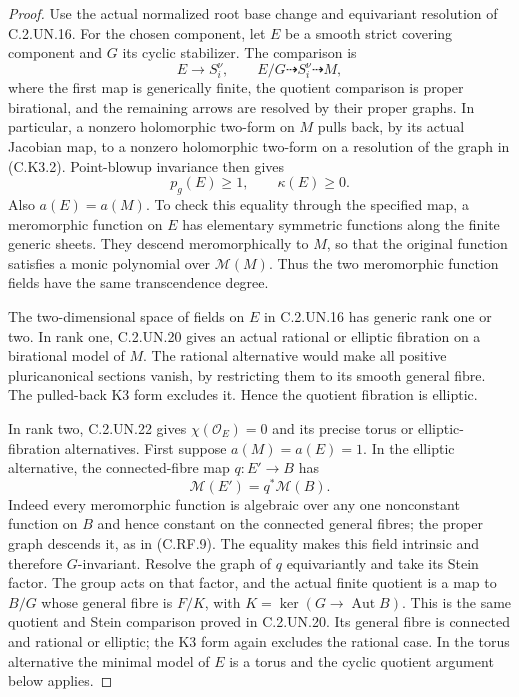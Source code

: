 \begin{proof}
Use the actual normalized root base change and equivariant
resolution of C.2.UN.16. For the chosen component, let $E$
be a smooth strict covering component and $G$ its cyclic
stabilizer. The comparison is
\[
 E\longrightarrow S_i^\nu,
 \qquad E/G\dashrightarrow S_i^\nu\dashrightarrow M,
                                                               \tag{C.K3.2}
\]
where the first map is generically finite, the quotient
comparison is proper birational, and the remaining arrows
are resolved by their proper graphs. In particular, a
nonzero holomorphic two-form on $M$ pulls back, by its
actual Jacobian map, to a nonzero holomorphic two-form on
a resolution of the graph in (C.K3.2). Point-blowup
invariance then gives
\[
                  p_g(E)\ge1,\qquad \kappa(E)\ge0.
                                                               \tag{C.K3.3}
\]
Also $a(E)=a(M)$. To check this equality through the
specified map, a meromorphic function on $E$ has elementary
symmetric functions along the finite generic sheets.
They descend meromorphically to $M$, so that the original
function satisfies a monic polynomial over $\mathcal M(M)$.
Thus the two meromorphic function fields have the same
transcendence degree.

The two-dimensional space of fields on $E$ in C.2.UN.16
has generic rank one or two. In rank one, C.2.UN.20 gives
an actual rational or elliptic fibration on a birational
model of $M$. The rational alternative would make all
positive pluricanonical sections vanish, by restricting
them to its smooth general fibre. The pulled-back K3
form excludes it. Hence the quotient fibration is elliptic.

In rank two, C.2.UN.22 gives $\chi(\mathcal O_E)=0$ and
its precise torus or elliptic-fibration alternatives.
First suppose $a(M)=a(E)=1$. In the elliptic alternative,
the connected-fibre map $q:E'\to B$ has
\[
                     \mathcal M(E')=q^*\mathcal M(B).
                                                               \tag{C.K3.4}
\]
Indeed every meromorphic function is algebraic over any
one nonconstant function on $B$ and hence constant on
the connected general fibres; the proper graph descends
it, as in (C.RF.9). The equality makes this field
intrinsic and therefore $G$-invariant. Resolve the graph
of $q$ equivariantly and take its Stein factor. The group
acts on that factor, and the actual finite quotient is a
map to $B/G$ whose general fibre is $F/K$, with
$K=\ker(G\to\operatorname{Aut}B)$. This is the same
quotient and Stein comparison proved in C.2.UN.20.
Its general fibre is connected and rational or elliptic;
the K3 form again excludes the rational case. In the
torus alternative the minimal model of $E$ is a torus
and the cyclic quotient argument below applies.


\end{proof}
